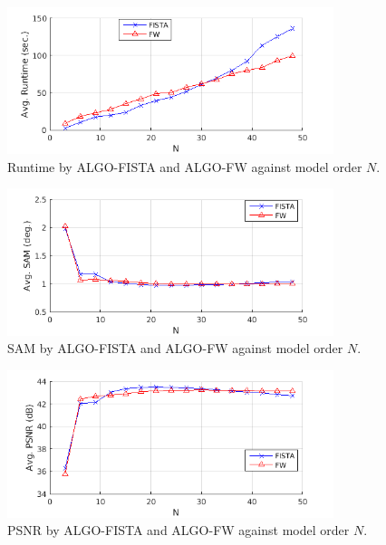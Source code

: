 \clearpage
\begin{figure}[h] \centering \includegraphics[width=0.85\textwidth]{./fig/fig_04Expt/72_TGRS_EXPT10_FUMI_MO_EFFECT/cuprite1997_200x348/200x348/DS4/SNR_40dB/cpu_time} \caption{Runtime by ALGO-FISTA and ALGO-FW against model order $N$.} \label{fig:ALGO_vs_N_speed} \end{figure}
\begin{figure}[h] \centering \includegraphics[width=0.85\textwidth]{./fig/fig_04Expt/72_TGRS_EXPT10_FUMI_MO_EFFECT/cuprite1997_200x348/200x348/DS4/SNR_40dB/sam}      \caption{SAM by ALGO-FISTA and ALGO-FW against model order $N$.}     \label{fig:ALGO_vs_N_sam}   \end{figure}
\begin{figure}[h] \centering \includegraphics[width=0.85\textwidth]{./fig/fig_04Expt/72_TGRS_EXPT10_FUMI_MO_EFFECT/cuprite1997_200x348/200x348/DS4/SNR_40dB/psnr}     \caption{PSNR by ALGO-FISTA and ALGO-FW against model order $N$.}    \label{fig:ALGO_vs_N_psnr}  \end{figure}

